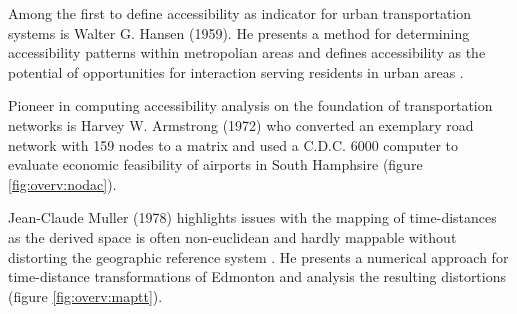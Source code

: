     Among the first to define accessibility as indicator for urban
    transportation systems is Walter G. Hansen (1959). He presents a method for
    determining accessibility patterns within metropolian areas and defines
    accessibility as the potential of opportunities for interaction serving
    residents in urban areas \cite{hansen1959accessibility}.\par


    Pioneer in computing accessibility analysis on the foundation of
    transportation networks is Harvey W. Armstrong (1972) who converted an
    exemplary road network with 159 nodes to a matrix and used a C.D.C. 6000
    computer to evaluate economic feasibility of airports in South Hamphsire
    \cite{armstrong1972network} (figure \ref{fig:overv:nodac}).\par

    Jean-Claude Muller (1978) highlights issues with the mapping of
    time-distances as the derived space is often non-euclidean and hardly
    mappable without distorting the geographic reference system
    \cite{muller1978mapping}. He presents a numerical approach for time-distance
    transformations of Edmonton and analysis the resulting distortions (figure
    \ref{fig:overv:maptt}).\par


